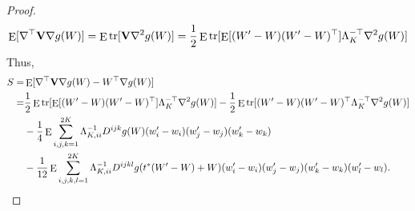 \documentclass[11pt]{article}
\DeclareMathOperator{\mytr}{tr}
\DeclareMathOperator{\myE}{E}
\theoremstyle{plain}
\theoremstyle{definition}
\theoremstyle{remark}
\begin{document}
\begin{proof}
\begin{equation*}
    \myE [\nabla^\top \BV \nabla g(W)] 
    =
    \myE \mytr [\BV \nabla^2 g(W)] 
    =
    \frac 1 2 \myE \mytr [ \myE [(W'-W)(W'-W)^\top] \Lambda_K^{-\top} \nabla^2 g(W)] 
\end{equation*}
Thus,
\begin{equation*}
    \begin{split}
    S=&\myE [\nabla^\top \BV \nabla g(W) -W^\top \nabla g(W)]\\
    =
&
    \frac 1 2 \myE \mytr [ \myE [(W'-W)(W'-W)^\top] \Lambda_K^{-\top} \nabla^2 g(W)] 
         -\frac 1 2 
\myE
         \mytr
         [
         (W'-W)
         (W'-W)^\top \Lambda_K^{-\top} \nabla^2 g(W)
     ]
     \\
         &-
         \frac 1 4 \myE
         \sum_{i,j,k=1}^{2K}
         \Lambda_{K,ii}^{-1} D^{ijk} g(W) (w_i'-w_i) (w_j'-w_j)(w_k'-w_k)
         \\
         &-
         \frac{1}{12} \myE
         \sum_{i,j,k,l=1}^{2K}
         \Lambda_{K,ii}^{-1} D^{ijkl} g(t^*(W'-W)+W) (w_i'-w_i) (w_j'-w_j)(w_k'-w_k) (w_l'-w_l).
    \end{split}
\end{equation*}


\end{proof}
\end{document}
